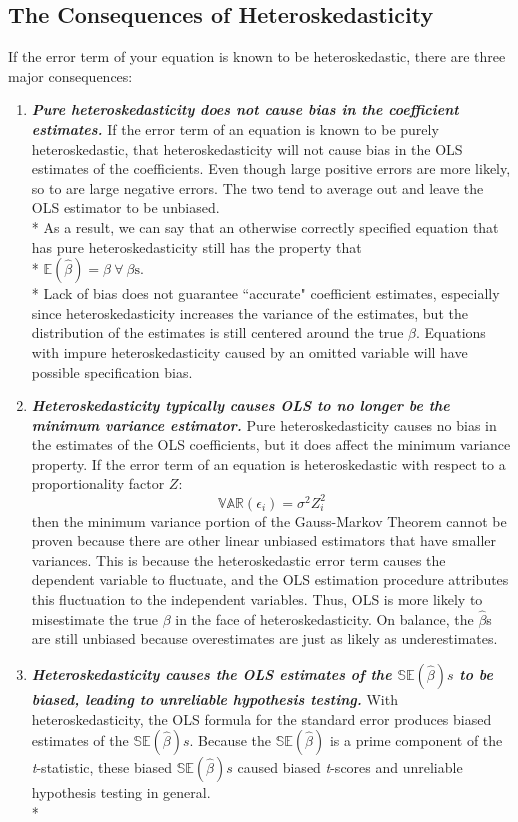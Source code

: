\documentclass[11pt]{article}
\begin{document}
\subsection{The Consequences of Heteroskedasticity}
If the error term of your equation is known to be heteroskedastic, there are three major consequences:
\begin{enumerate}
\item \textbf{\textit{Pure heteroskedasticity does not cause bias in the coefficient estimates.}} If the error term of an equation is known to be purely heteroskedastic, that heteroskedasticity will not cause bias in the OLS estimates of the coefficients. Even though large positive errors are more likely, so to are large negative errors. The two tend to average out and leave the OLS estimator to be unbiased.\\*
As a result, we can say that an otherwise correctly specified equation that has pure heteroskedasticity still has the property that\\* $\mathbb{E}(\hat{\beta}) = \beta \> \forall\> \beta \text{s}$. \\*
Lack of bias does not guarantee ``accurate" coefficient estimates, especially since heteroskedasticity increases the variance of the estimates, but the distribution of the estimates is still centered around the true $\beta$. Equations with impure heteroskedasticity caused by an omitted variable will have possible specification bias.
\item \textbf{\textit{Heteroskedasticity typically causes OLS to no longer be the minimum variance estimator.}} Pure heteroskedasticity causes no bias in the estimates of the OLS coefficients, but it does affect the minimum variance property. If the error term of an equation is heteroskedastic with respect to a proportionality factor $Z$:
\begin{equation}
\mathbb{VAR}(\epsilon_i) = \sigma^2 Z_i^2 \label{eg10_5}
\end{equation}
then the minimum variance portion of the Gauss-Markov Theorem cannot be proven because there are other linear unbiased estimators that have smaller variances. This is because the heteroskedastic error term causes the dependent variable to fluctuate, and the OLS estimation procedure attributes this fluctuation to the independent variables. Thus, OLS is more likely to misestimate the true $\beta$ in the face of heteroskedasticity. On balance, the $\hat{\beta}$s are still unbiased because overestimates are just as likely as underestimates. 
\item \textit{\textbf{Heteroskedasticity causes the OLS estimates of the $\mathbb{SE}(\hat{\beta})s$ to be biased, leading to unreliable hypothesis testing.}} With heteroskedasticity, the OLS formula for the standard error produces biased estimates of the $\mathbb{SE}(\hat{\beta})s$. Because the $\mathbb{SE}(\hat{\beta})$ is a prime component of the \textit{t}-statistic, these biased $\mathbb{SE}(\hat{\beta})s$ caused biased \textit{t}-scores and unreliable hypothesis testing in general.\\*

\end{enumerate}
\end{document}
